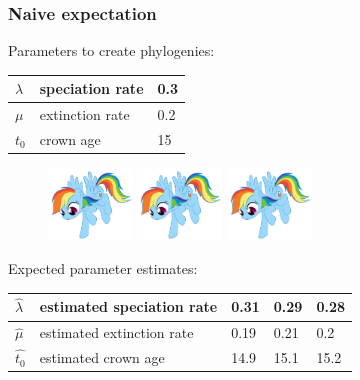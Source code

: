 \documentclass{beamer}
\begin{document}
\begin{frame}
  \frametitle{Naive expectation}

  Parameters to create phylogenies:

  \begin{table}
    \centering
    \begin{tabular}{ | l | l | l | }
      \hline
      $\lambda$ & speciation rate & 0.3 \\
      \hline
      $\mu$ & extinction rate & 0.2 \\
      \hline
      $t_0$ & crown age & 15 \\
      \hline
    \end{tabular}
  \end{table}

  \begin{figure}
    \includegraphics[width=0.2\textwidth]{rainbow_dash_by_chano_kun-d46c0a6.jpg}
    \includegraphics[width=0.2\textwidth]{rainbow_dash_by_chano_kun-d46c0a6.jpg}
    \includegraphics[width=0.2\textwidth]{rainbow_dash_by_chano_kun-d46c0a6.jpg}
  \end{figure}



  Expected parameter estimates:

  \begin{table}
    \begin{tabular}{ | l | l | l | l | l | }
      \hline
      $\hat{\lambda}$ & estimated speciation rate & 0.31 & 0.29 & 0.28 \\
      \hline
      $\hat{\mu}$ & estimated extinction rate & 0.19 & 0.21 & 0.2 \\
      \hline
      $\hat{t_0}$ & estimated crown age & 14.9 & 15.1 & 15.2 \\
      \hline
    \end{tabular}
  \end{table}


\end{frame}
\end{document}
